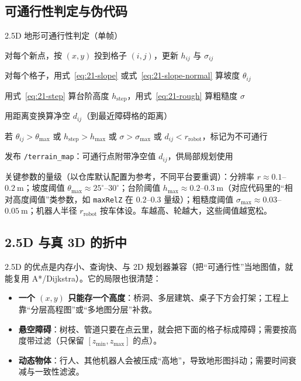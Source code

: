 \subsection{可通行性判定与伪代码}

\begin{pseudo}{2.5D 地形可通行性判定（单帧）}
  \item 对每个新点，按 $(x,y)$ 投到格子 $(i,j)$，更新 $h_{ij}$ 与 $\sigma_{ij}$
  \item 对每个格子，用式~\eqref{eq:21-slope} 或式~\eqref{eq:21-slope-normal} 算坡度 $\theta_{ij}$
  \item 用式~\eqref{eq:21-step} 算台阶高度 $h_{\mathrm{step}}$，用式~\eqref{eq:21-rough} 算粗糙度 $\sigma$
  \item 用距离变换算净空 $d_{ij}$（到最近障碍格的距离）
  \item 若 $\theta_{ij}>\theta_{\max}$ 或 $h_{\mathrm{step}}>h_{\max}$ 或 $\sigma>\sigma_{\max}$ 或 $d_{ij}<r_{\mathrm{robot}}$，标记为不可通行
  \item 发布 \texttt{/terrain\_map}：可通行点附带净空值 $d_{ij}$，供局部规划使用
\end{pseudo}

关键参数的量级（以仓库默认配置为参考，不同平台要重调）：分辨率 $r\approx0.1$--$0.2\ \mathrm{m}$；坡度阈值 $\theta_{\max}\approx25^\circ$--$30^\circ$；台阶阈值 $h_{\max}\approx0.2$--$0.3\ \mathrm{m}$（对应代码里的“相对高度阈值”类参数，如 \texttt{maxRelZ} 在 $0.2$--$0.3$ 量级）；粗糙度阈值 $\sigma_{\max}\approx0.03$--$0.05\ \mathrm{m}$；机器人半径 $r_{\mathrm{robot}}$ 按车体设。车越高、轮越大，这些阈值越宽松。

\subsection{2.5D 与真 3D 的折中}

2.5D 的优点是内存小、查询快、与 2D 规划器兼容（把“可通行性”当地图值，就能复用 A*/Dijkstra）。它的局限也很清楚：

\begin{itemize}
  \item \textbf{一个 $(x,y)$ 只能存一个高度}：桥洞、多层建筑、桌子下方会打架；工程上靠“分层高程图”或“多地图分层”补救。
  \item \textbf{悬空障碍}：树枝、管道只要在点云里，就会把下面的格子标成障碍；需要按高度带过滤（只保留 $[z_{\min},z_{\max}]$ 的点）。
  \item \textbf{动态物体}：行人、其他机器人会被压成“高地”，导致地形图抖动；需要时间衰减与一致性滤波。
\end{itemize}

